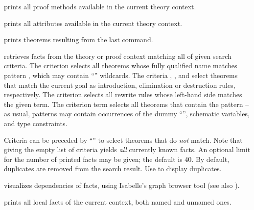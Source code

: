 \begin{isabellebody}
\begin{isamarkuptext}
\begin{descr}
  \item [\mbox{\isa{\isacommand{print{\isacharunderscore}methods}}}] prints all proof methods
  available in the current theory context.
  
  \item [\mbox{\isa{\isacommand{print{\isacharunderscore}attributes}}}] prints all attributes
  available in the current theory context.
  
  \item [\mbox{\isa{\isacommand{print{\isacharunderscore}theorems}}}] prints theorems resulting from
  the last command.
  
  \item [\mbox{\isa{\isacommand{find{\isacharunderscore}theorems}}}~\isa{criteria}] retrieves facts
  from the theory or proof context matching all of given search
  criteria.  The criterion  selects all theorems
  whose fully qualified name matches pattern , which may
  contain ``\isa{{\isachardoublequote}{\isacharasterisk}{\isachardoublequote}}'' wildcards.  The criteria ,
  , and  select theorems that match the
  current goal as introduction, elimination or destruction rules,
  respectively.  The criterion  selects all rewrite
  rules whose left-hand side matches the given term.  The criterion
  term  selects all theorems that contain the pattern  -- as usual, patterns may contain occurrences of the dummy
  ``\isa{{\isacharunderscore}}'', schematic variables, and type constraints.
  
  Criteria can be preceded by ``\isa{{\isachardoublequote}{\isacharminus}{\isachardoublequote}}'' to select theorems that
  do \emph{not} match. Note that giving the empty list of criteria
  yields \emph{all} currently known facts.  An optional limit for the
  number of printed facts may be given; the default is 40.  By
  default, duplicates are removed from the search result. Use
  \mbox{} to display duplicates.
  
  \item [\mbox{\isa{\isacommand{thm{\isacharunderscore}deps}}}~\isa{{\isachardoublequote}a\isactrlsub {\isadigit{1}}\ {\isasymdots}\ a\isactrlsub n{\isachardoublequote}}]
  visualizes dependencies of facts, using Isabelle's graph browser
  tool (see also \cite{isabelle-sys}).
  
  \item [\mbox{\isa{\isacommand{print{\isacharunderscore}facts}}}] prints all local facts of the
  current context, both named and unnamed ones.
  

\end{descr}
\end{isamarkuptext}
\end{isabellebody}
